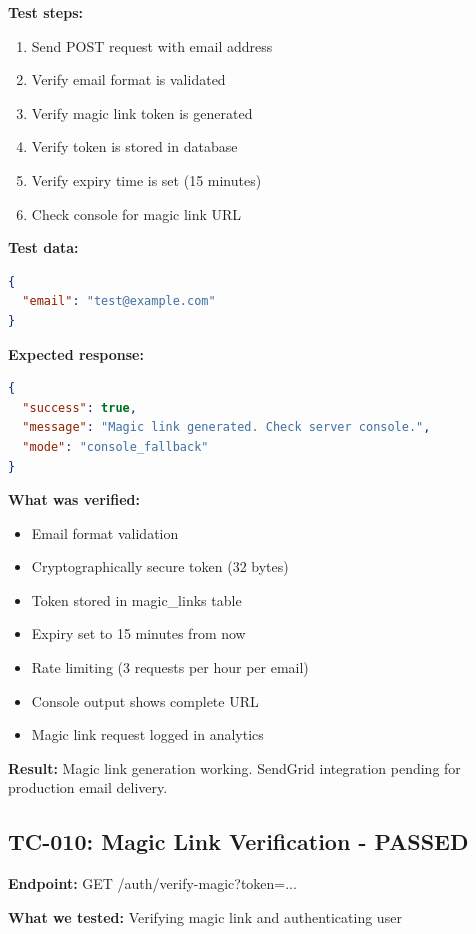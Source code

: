 \documentclass[11pt,a4paper]{article}
\begin{document}
\textbf{Test steps:}
\begin{enumerate}
    \item Send POST request with email address
    \item Verify email format is validated
    \item Verify magic link token is generated
    \item Verify token is stored in database
    \item Verify expiry time is set (15 minutes)
    \item Check console for magic link URL
\end{enumerate}

\textbf{Test data:}
\begin{lstlisting}[language=json]
{
  "email": "test@example.com"
}
\end{lstlisting}

\textbf{Expected response:}
\begin{lstlisting}[language=json]
{
  "success": true,
  "message": "Magic link generated. Check server console.",
  "mode": "console_fallback"
}
\end{lstlisting}

\textbf{What was verified:}
\begin{itemize}
    \item Email format validation
    \item Cryptographically secure token (32 bytes)
    \item Token stored in magic\_links table
    \item Expiry set to 15 minutes from now
    \item Rate limiting (3 requests per hour per email)
    \item Console output shows complete URL
    \item Magic link request logged in analytics
\end{itemize}

\textbf{Result:} Magic link generation working. SendGrid integration pending for production email delivery.

\subsection{TC-010: Magic Link Verification - PASSED}
\textbf{Endpoint:} GET /auth/verify-magic?token=...

\textbf{What we tested:} Verifying magic link and authenticating user
\end{document}
